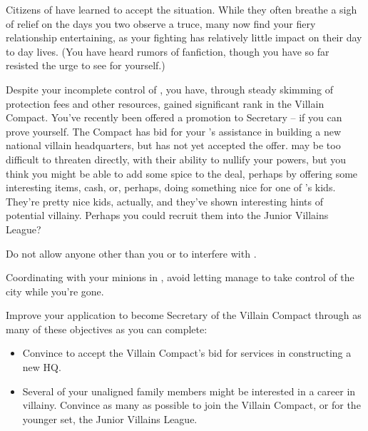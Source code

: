 \documentclass[char]{LRSguildcamp1}
\begin{document}
Citizens of \pCityO{} have learned to accept the situation. While they often breathe a sigh of relief on the days you two observe a truce, many now find your fiery relationship entertaining, as your fighting has relatively little impact on their day to day lives.  (You have heard rumors of fanfiction, though you have so far resisted the urge to see for yourself.)

Despite your incomplete control of \pCityO{}, you have, through steady skimming of protection fees and other resources, gained significant rank in the Villain Compact.  You've recently been offered a promotion to Secretary -- if you can prove yourself.  The Compact has bid for your \cArchitect{\sibling} \cArchitect{}'s assistance in building a new national villain headquarters, but \cArchitect{} has not yet accepted the offer.  \cArchitect{} may be too difficult to threaten directly, with their ability to nullify your powers, but you think you might be able to add some spice to the deal, perhaps by offering some interesting items, cash, or, perhaps, doing something nice for one of \cArchitect{}'s kids.  They're pretty nice kids, actually, and they've shown interesting hints of potential villainy.  Perhaps you could recruit them into the Junior Villains League?

\begin{itemz}[Goals]
	\item Do not allow anyone other than you or \cOS{} to interfere with \pCityO{}.
	\item Coordinating with your minions in \pCityO{}, avoid letting \cOS{} manage to take control of the city while you're gone.
	\item Improve your application to become Secretary of the Villain Compact through as many of these objectives as you can complete:
	\begin{itemize}
		\item Convince \cArchitect{} to accept the Villain Compact's bid for \cArchitect{\their} services in constructing a new HQ.
		\item Several of your unaligned family members might be interested in a career in villainy.  Convince as many as possible to join the Villain Compact, or for the younger set, the Junior Villains League.
	\end{itemize}
\end{itemz}
\end{document}
